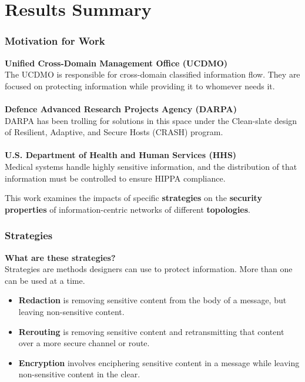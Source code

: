 \documentclass[t,handout]{beamer}
\begin{document}
\section{Results Summary}

\begin{frame}
\frametitle{Motivation for Work}
{\bf Unified Cross-Domain Management Office (UCDMO)} \\
{\small The UCDMO is responsible for cross-domain classified information flow.  They are focused on protecting information while providing it to whomever needs it.} \\
~\\
{\bf Defence Advanced Research Projects Agency (DARPA)} \\
{\small DARPA has been trolling for solutions in this space under the Clean-slate design of Resilient, Adaptive, and Secure Hosts (CRASH) program.} \\
~\\
{\bf U.S. Department of Health and Human Services (HHS)} \\
{\small Medical systems handle highly sensitive information, and the distribution of that information must be controlled to ensure HIPPA compliance.} \\
\begin{center}
{\small This work examines the impacts of specific {\bf strategies} on the {\bf security properties} of information-centric networks of different {\bf topologies}.}
\end{center}
\end{frame}

\begin{frame}
\frametitle{Strategies}
{\bf What are these strategies?} \\
{\small Strategies are methods designers can use to protect information.  More than one can be used at a time.} \\
\begin{small}
\begin{itemize}
\item {\bf Redaction} is removing sensitive content from the body of a message, but leaving non-sensitive content.
\item {\bf Rerouting} is removing sensitive content and retransmitting that content over a more secure channel or route.
\item {\bf Encryption} involves enciphering sensitive content in a message while leaving non-sensitive content in the clear.
\end{itemize}
\end{small}
\end{frame}
\end{document}
